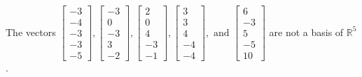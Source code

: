 \begin{exercise}
\begin{exerciseStatement}
  \end{exerciseStatement}
  \begin{exerciseAnswer}
   The vectors \(\left[\begin{array}{r}
-3 \\
-4 \\
-3 \\
-3 \\
-5
\end{array}\right] , \left[\begin{array}{r}
-3 \\
0 \\
-3 \\
3 \\
-2
\end{array}\right] , \left[\begin{array}{r}
2 \\
0 \\
4 \\
-3 \\
-1
\end{array}\right] , \left[\begin{array}{r}
3 \\
3 \\
4 \\
-4 \\
-4
\end{array}\right] , \text{ and } \left[\begin{array}{r}
6 \\
-3 \\
5 \\
-5 \\
10
\end{array}\right]\) 
  	 are not  a basis of \(\mathbb{R}^5\).
  


  \end{exerciseAnswer}
\end{exercise}